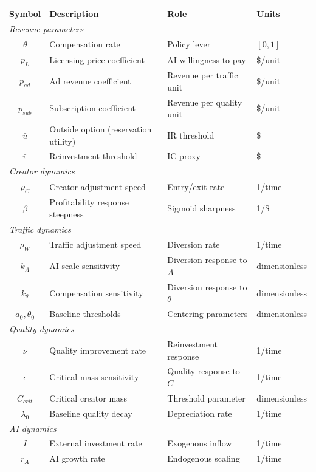 \documentclass[11pt,a4paper]{article}
\begin{document}
\begin{center}
\begin{tabular}{clll}
\toprule
Symbol & Description & Role & Units \\
\midrule
\multicolumn{4}{l}{\textit{Revenue parameters}} \\
$\theta$ & Compensation rate & Policy lever & $[0,1]$ \\
$p_L$ & Licensing price coefficient & AI willingness to pay & \$/unit \\
$p_{ad}$ & Ad revenue coefficient & Revenue per traffic unit & \$/unit \\
$p_{sub}$ & Subscription coefficient & Revenue per quality unit & \$/unit \\
$\bar{u}$ & Outside option (reservation utility) & IR threshold & \$ \\
$\bar{\pi}$ & Reinvestment threshold & IC proxy & \$ \\
\midrule
\multicolumn{4}{l}{\textit{Creator dynamics}} \\
$\rho_C$ & Creator adjustment speed & Entry/exit rate & 1/time \\
$\beta$ & Profitability response steepness & Sigmoid sharpness & 1/\$ \\
\midrule
\multicolumn{4}{l}{\textit{Traffic dynamics}} \\
$\rho_W$ & Traffic adjustment speed & Diversion rate & 1/time \\
$k_A$ & AI scale sensitivity & Diversion response to $A$ & dimensionless \\
$k_\theta$ & Compensation sensitivity & Diversion response to $\theta$ & dimensionless \\
$a_0, \theta_0$ & Baseline thresholds & Centering parameters & dimensionless \\
\midrule
\multicolumn{4}{l}{\textit{Quality dynamics}} \\
$\nu$ & Quality improvement rate & Reinvestment response & 1/time \\
$\epsilon$ & Critical mass sensitivity & Quality response to $C$ & 1/time \\
$C_{crit}$ & Critical creator mass & Threshold parameter & dimensionless \\
$\lambda_0$ & Baseline quality decay & Depreciation rate & 1/time \\
\midrule
\multicolumn{4}{l}{\textit{AI dynamics}} \\
$I$ & External investment rate & Exogenous inflow & 1/time \\
$r_A$ & AI growth rate & Endogenous scaling & 1/time \\

\end{tabular}
\end{center}
\end{document}
